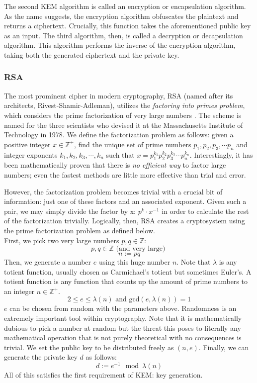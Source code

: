 \documentclass[a4paper]{article}
\begin{document}
The second KEM algorithm is called an encryption or encapsulation
algorithm. As the name suggests, the encryption algorithm obfuscates the
plaintext and returns a ciphertext. Crucially, this function takes the
aforementioned public key as an input. The third algorithm, then, is
called a decryption or decapsulation algorithm. This algorithm performs
the inverse of the encryption algorithm, taking both the generated
ciphertext and the private key.

\subsubsection[rsa]{RSA}
The most prominent cipher in
modern cryptography, RSA (named after its architects,
Rivest-Shamir-Adleman), utilizes the \emph{factoring into primes
problem}, which considers the prime factorization of very large numbers
\autocite{schneierAppliedCryptographyProtocols1996}. The scheme is named for
the three scientists who devised it at the Massachusetts Institute of
Technology in 1978. We define the factorization problem as follows:
given a positive integer \(x \in \mathbb{Z}^+\), find the unique set of
prime numbers \(p_1, p_2, p_3, \cdots p_n\) and integer exponents
\(k_1, k_2, k_3,\cdots,k_n\) such that
\(x = p_1^{k_1}p_2^{k_2}p_3^{k_3} \cdots p_n^{k_n}\). Interestingly, it
has been mathematically proven that there is \emph{no efficient way} to
factor large numbers; even the fastest methods are little more effective
than trial and error.

However, the factorization problem becomes trivial with a crucial bit of
information: just one of these factors and an associated exponent. Given
such a pair, we may simply divide the factor by x: \(p^k \cdot x^{-1}\)
in order to calculate the rest of the factorization trivially.
Logically, then, RSA creates a cryptosystem using the prime
factorization problem as defined below.\\

First, we pick two very large numbers \(p, q \in \mathbb{Z}\):
\[ p, q \in \mathbb{Z} \text{ (and very large) } \] \[ n := pq\] Then,
we generate a number \(e\) using this huge number \(n\). Note that
\(\lambda\) is any totient function, usually chosen as Carmichael's
totient but sometimes Euler's. A totient function is any function that
counts up the amount of prime numbers to an integer
\(n \in \mathbb{Z}^+\).
\[ 2 \leq e \leq \lambda(n) \text{ and } \text{gcd}(e, \lambda(n)) = 1\]
\(e\) can be chosen from random with the parameters above. Randomness is
an extremely important tool within cryptography. Note that it is
mathematically dubious to pick a number at random but the threat this
poses to literally any mathematical operation that is not purely
theoretical with no consequences is trivial. We set the public key to be
distributed freely as \((n, e)\). Finally, we can generate the private
key \(d\) as follows: \[ d := e^{-1} \mod{\lambda(n)} \] All of this
satisfies the first requirement of KEM: key generation.
\end{document}
